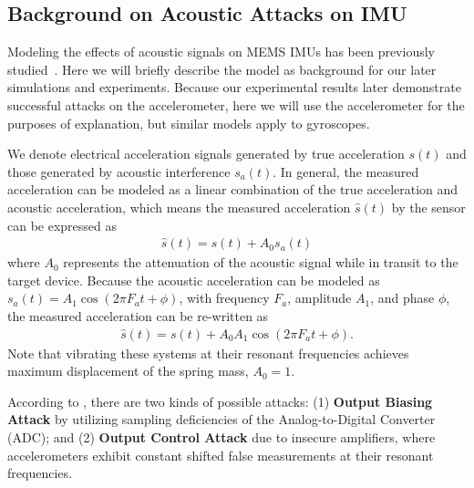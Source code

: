
\subsection{Background on Acoustic Attacks on IMU}
\label{sec:background}
Modeling the effects of acoustic signals on MEMS IMUs has been previously studied~\cite{trippel2017walnut}. Here we will briefly describe the model as background for our later simulations and experiments. Because our experimental results later demonstrate successful attacks on the accelerometer, 
here we will use the accelerometer for the purposes of explanation, but similar models apply to gyroscopes.

We denote electrical acceleration signals generated by true acceleration $s(t)$ and those generated
by acoustic interference $s_a(t)$. In general, the measured acceleration can be modeled as a linear combination of the true acceleration and acoustic acceleration, which means the measured acceleration $\hat{s}(t)$ by the sensor can be expressed as
\begin{align}
    \hat{s}(t) = s(t) + A_0 s_a(t)
\end{align}
where $A_0$ represents the attenuation of the acoustic signal while in transit to the target device. Because the acoustic acceleration can be modeled as $s_a(t) = A_1 \cos(2\pi F_a t+\phi)$, with frequency $F_a$, amplitude $A_1$, and phase $\phi$, the measured acceleration can be re-written as
\begin{align}
    \hat{s}(t) = s(t) + A_0 A_1  \cos(2\pi F_a t+\phi).
\end{align}
Note that vibrating these systems at their resonant frequencies achieves maximum displacement of the spring mass, \ie $A_0 = 1$.

According to \cite{trippel2017walnut}, there are two kinds of possible attacks: (1) \textbf{Output Biasing Attack} by utilizing sampling deficiencies of the Analog-to-Digital Converter (ADC); and (2) \textbf{Output Control Attack} due to insecure amplifiers, where accelerometers exhibit constant shifted false measurements at their resonant frequencies. 

